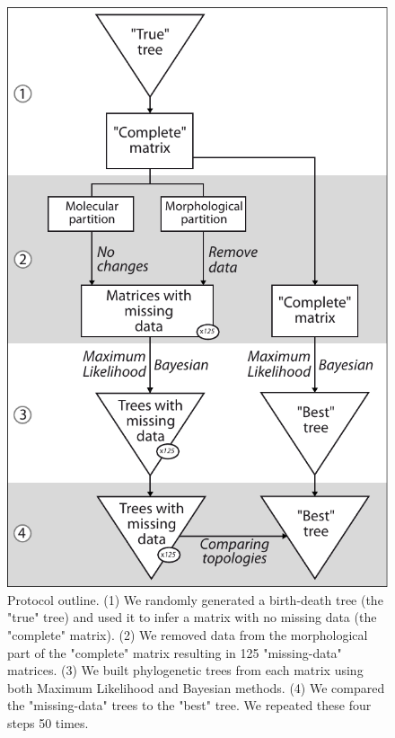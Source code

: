 \documentclass[12pt,letterpaper]{article}
\begin{document}
\begin{figure}
\centering
    \includegraphics[keepaspectratio=true]{Figures/In_main/Simulations_outline-BW.pdf}
\caption{Protocol outline.
(1) We randomly generated a birth-death tree (the "true" tree) and used it to infer a matrix with no missing data (the "complete" matrix).
(2) We removed data from the morphological part of the "complete" matrix resulting in 125 "missing-data" matrices.
(3) We built phylogenetic trees from each matrix using both Maximum Likelihood and Bayesian methods.
(4) We compared the "missing-data" trees to the "best" tree.
We repeated these four steps 50 times.}
\label{Fig_Outline}
\end{figure}

\end{document}
